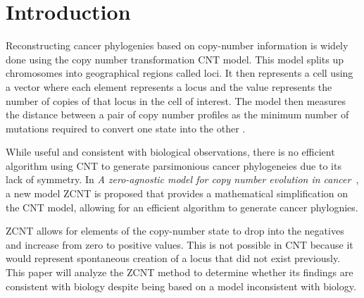 \section{Introduction}

Reconstructing cancer phylogenies based on copy-number information is widely done using the copy number transformation CNT model. This model splits up chromosomes into geographical regions called loci. It then represents a cell using a vector where each element represents a locus and the value represents the number of copies of that locus in the cell of interest. The model then measures the distance between a pair of copy number profiles as the minimum number of mutations required to convert one state into the other \cite{cnt_paper}. 

While useful and consistent with biological observations, there is no efficient algorithm using CNT to generate parsimonious cancer phylogeneies due to its lack of symmetry. In {\it A zero-agnostic model for copy number evolution in cancer\/}~\cite{zcnt_paper}, a new model ZCNT is proposed that provides a mathematical simplification on the CNT model, allowing for an efficient algorithm to generate cancer phylognies.

ZCNT allows for elements of the copy-number state to drop into the negatives and increase from zero to positive values. This is not possible in CNT because it would represent spontaneous creation of a locus that did not exist previously. This paper will analyze the ZCNT method to determine whether its findings are consistent with biology despite being based on a model inconsistent with biology. 
